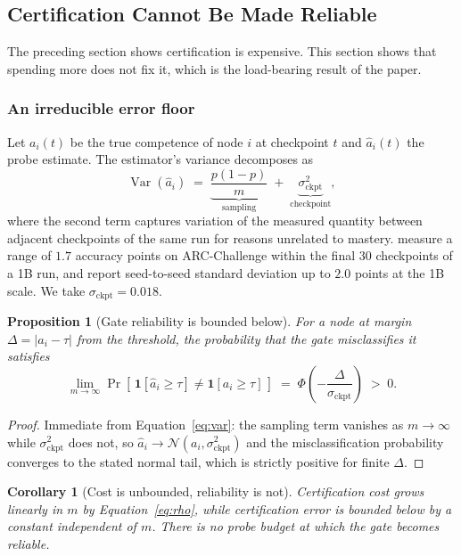 \documentclass[11pt]{article}
\theoremstyle{plain}
\newtheorem{corollary}{Corollary}
\newtheorem{proposition}{Proposition}
\theoremstyle{definition}
\theoremstyle{remark}
\begin{document}
\subsection{Certification Cannot Be Made Reliable}
\label{sec:reliability}

The preceding section shows certification is expensive. This section shows that
spending more does not fix it, which is the load-bearing result of the paper.

\subsubsection{An irreducible error floor}

Let $a_i(t)$ be the true competence of node $i$ at checkpoint $t$ and
$\hat{a}_i(t)$ the probe estimate. The estimator's variance decomposes as
\begin{equation}
\operatorname{Var}(\hat{a}_i) \;=\; \underbrace{\frac{p(1-p)}{m}}_{\text{sampling}}
\;+\; \underbrace{\sigma^2_{\text{ckpt}}}_{\text{checkpoint}},
\label{eq:var}
\end{equation}
where the second term captures variation of the measured quantity between
adjacent checkpoints of the same run for reasons unrelated to mastery.
\citet{heineman2025signal} measure a range of $1.7$ accuracy points on
ARC-Challenge within the final 30 checkpoints of a 1B run, and
\citet{magnusson2025datadecide} report seed-to-seed standard deviation up to
$2.0$ points at the 1B scale. We take $\sigma_{\text{ckpt}} = 0.018$.

\begin{proposition}[Gate reliability is bounded below]
\label{prop:floor}
For a node at margin $\Delta = |a_i - \tau|$ from the threshold, the probability
that the gate misclassifies it satisfies
\[
\lim_{m \to \infty} \Pr\!\left[\,\mathbf{1}[\hat{a}_i \ge \tau] \neq \mathbf{1}[a_i \ge \tau]\,\right]
\;=\; \Phi\!\left(-\frac{\Delta}{\sigma_{\text{ckpt}}}\right) \;>\; 0 .
\]
\end{proposition}

\begin{proof}
Immediate from Equation~\ref{eq:var}: the sampling term vanishes as $m \to
\infty$ while $\sigma^2_{\text{ckpt}}$ does not, so $\hat{a}_i \to
\mathcal{N}(a_i, \sigma^2_{\text{ckpt}})$ and the misclassification probability
converges to the stated normal tail, which is strictly positive for finite
$\Delta$.
\end{proof}

\begin{corollary}[Cost is unbounded, reliability is not]
Certification cost grows linearly in $m$ by Equation~\ref{eq:rho}, while
certification error is bounded below by a constant independent of $m$. There is
no probe budget at which the gate becomes reliable.
\end{corollary}
\end{document}
